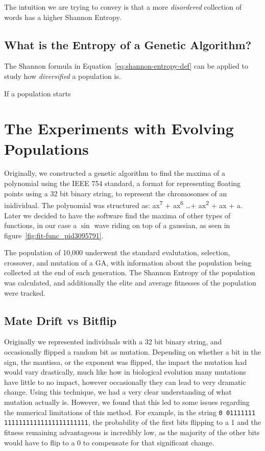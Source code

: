 \documentclass[11pt]{article}
\begin{document}
The intuition we are trying to convey is that a more \emph{disordered}
collection of words has a higher Shannon Entropy.


\subsection{What is the Entropy of a Genetic Algorithm?}

The Shannon formula in Equation~\ref{eq:shannon-entropy-def} can be
applied to study how \emph{diversified} a population is.

If a population starts 



\section{The Experiments with Evolving Populations}

Originally, we constructed a genetic algorithm to find the maxima of a
polynomial using the IEEE 754 standard, a format for 
representing floating points using a 32 bit binary string, to represent the
chromosomes of an inidividual. The polynomial was structured as:
ax\textsuperscript{7} + ax\textsuperscript{6} \ldots +
ax\textsuperscript{2} + ax + a. Later we decided to have the software
find the maxima of other types of functions, in our case a $\sin$ wave
riding on top of a gaussian, as seen in figure~\ref{fig:fit-func_pid3095791}.


The population of 10,000 underwent the standard evalutation,
selection, crossover, and mutation of a GA, with information about the
population being collected at the end of each generation. The Shannon 
Entropy of the population was calculated, and additionally the elite and average
fitnesses of the population were tracked.

\subsection{Mate Drift vs Bitflip}

Originally we represented individuals with a 32 bit binary string, and
occasionally flipped a random bit as mutation. Depending on whether a
bit in the sign, the mantissa, or the exponent was flipped, the impact
the mutation had would vary drastically, much like how in biological
evolution many mutations have little to no impact, however
occasionally they can lead to very dramatic change. Using this
technique, we had a very clear understanding of what mutation actually
is. However, we found that this led to some issues regarding the
numerical limitations of this method. For example, in the string
\texttt{0 01111111 11111111111111111111111}, the probability of the
first bits flipping to a 1 and the fitness remaining advantageous is
incredibly low, as the majority of the other bits would have to flip
to a 0 to compensate for that significant change.
\end{document}
